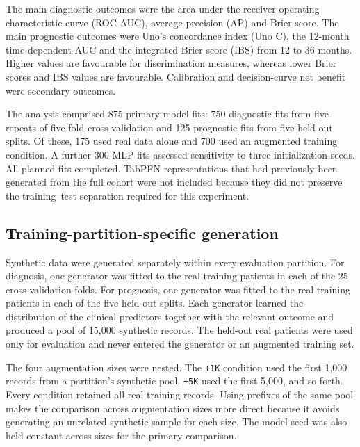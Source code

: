 The main diagnostic outcomes were the area under the receiver operating
characteristic curve (ROC AUC), average precision (AP) and Brier score.  The
main prognostic outcomes were Uno's concordance index (Uno C), the 12-month
time-dependent AUC and the integrated Brier score (IBS) from 12 to 36 months.  Higher values
are favourable for discrimination measures, whereas lower Brier scores and IBS
values are favourable.  Calibration and decision-curve net benefit were
secondary outcomes.

The analysis comprised 875 primary model fits: 750 diagnostic fits from five
repeats of five-fold cross-validation and 125 prognostic fits from five held-out
splits.  Of these, 175 used real data alone and 700 used an augmented training
condition.  A further 300 MLP fits assessed sensitivity to three initialization
seeds.  All planned fits completed.  TabPFN representations that
had previously been generated from the full cohort were not included because
they did not preserve the training--test separation required for this
experiment.

\subsection{Training-partition-specific generation}
\label{sec:augmentation:construction}

Synthetic data were generated separately within every evaluation partition.
For diagnosis, one generator was fitted to the real training patients in each
of the 25 cross-validation folds.  For prognosis, one generator was fitted to
the real training patients in each of the five held-out splits.  Each generator
learned the distribution of the clinical predictors together with the relevant
outcome and produced a pool of 15,000 synthetic records.  The held-out real
patients were used only for evaluation and never entered the generator or an
augmented training set.

The four augmentation sizes were nested.  The \texttt{+1K} condition used the
first 1,000 records from a partition's synthetic pool, \texttt{+5K} used the
first 5,000, and so forth.  Every condition retained all real training records.
Using prefixes of the same pool makes the comparison across augmentation sizes
more direct because it avoids generating an unrelated synthetic sample for
each size.  The model seed was also held constant across sizes for the primary
comparison.

